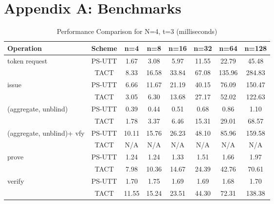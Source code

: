 
\section{Appendix A: Benchmarks}\label{chap5:appendix-tactvspsutt-results}
\begin{table}[htbp]
\centering
\caption{Performance Comparison for N=4, t=3 (milliseconds)}
\begin{tabular}{lccccccc}
\toprule
\textbf{Operation} & \textbf{Scheme} & \textbf{n=4} & \textbf{n=8} & \textbf{n=16} & \textbf{n=32} & \textbf{n=64} & \textbf{n=128} \\
\midrule
token request & PS-UTT & 1.67 & 3.08 & 5.97 & 11.55 & 22.79 & 45.48 \\
 & TACT & 8.33 & 16.58 & 33.84 & 67.08 & 135.96 & 284.83 \\
\midrule
issue & PS-UTT & 6.66 & 11.67 & 21.19 & 40.15 & 76.09 & 150.47 \\
 & TACT & 3.05 & 6.30 & 13.68 & 27.17 & 52.02 & 122.63 \\
\midrule
(aggregate, unblind) & PS-UTT & 0.39 & 0.44 & 0.51 & 0.68 & 0.86 & 1.10 \\
 & TACT & 1.78 & 3.37 & 6.46 & 15.31 & 29.01 & 68.57 \\
\midrule
(aggregate, unblind)+ vfy & PS-UTT & 10.11 & 15.76 & 26.23 & 48.10 & 85.96 & 159.58 \\
 & TACT & N/A & N/A & N/A & N/A & N/A & N/A \\
\midrule
prove & PS-UTT & 1.24 & 1.24 & 1.33 & 1.51 & 1.66 & 1.97 \\
 & TACT & 7.98 & 10.36 & 14.67 & 24.39 & 42.76 & 70.61 \\
\midrule
verify & PS-UTT & 1.70 & 1.75 & 1.69 & 1.69 & 1.68 & 1.70 \\
 & TACT & 11.55 & 15.24 & 23.51 & 44.30 & 72.31 & 138.38 \\
\bottomrule
\end{tabular}
\label{tab:perf-comp-4-3}
\end{table}


